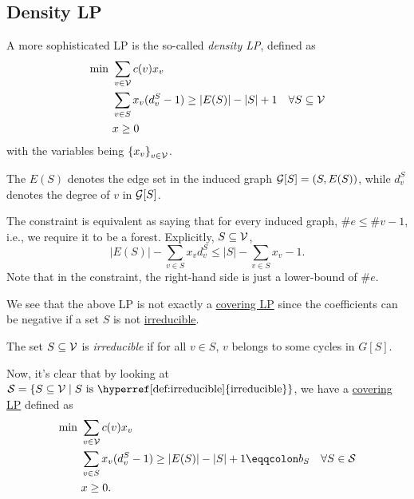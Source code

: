 \subsection{Density LP}

A more sophisticated LP is the so-called \emph{density LP}, defined as
\begin{align*}
	\min~ & \sum_{v\in \mathcal{\MakeUppercase{v}} } c(v) x_v                                                                                                  \\
	      & \sum_{v\in S} x_v(d_v^{S} - 1) \geq \left\vert E(S) \right\vert - \left\vert S \right\vert + 1\quad \forall S\subseteq \mathcal{\MakeUppercase{v}} \\
	      & x\geq 0
\end{align*}
with the variables being \(\left\{ x_v \right\} _{v\in \mathcal{\MakeUppercase{v}} }\).

\begin{notation}
	The \(E(S)\) denotes the edge set in the induced graph \(\mathcal{\MakeUppercase{g}} [S] = (S, E(S))\), while \(d_v^S\) denotes the degree of \(v\) in \(\mathcal{\MakeUppercase{g}} [S]\).
\end{notation}

\begin{intuition}
	The constraint is equivalent as  saying that for every induced graph, \(\# e \leq \# v - 1\), i.e., we require it to be a forest. Explicitly, \(S\subseteq \mathcal{\MakeUppercase{v}} \),
	\[
		\left\vert E(S) \right\vert - \sum_{v\in S} x_v d_v^S\leq \left\vert S \right\vert - \sum_{v\in S}x_v - 1.
	\]
	Note that in the constraint, the right-hand side is just a lower-bound of \(\# e\).
\end{intuition}

We see that the above LP is not exactly a \hyperref[def:covering-LP]{covering LP} since the coefficients can be negative if a set \(S\) is not \hyperref[def:irreducible]{irreducible}.

\begin{definition}[Irreducible]\label{def:irreducible}
	The set \(S\subseteq \mathcal{\MakeUppercase{v}} \) is \emph{irreducible} if for all \(v\in S\), \(v\) belongs to some cycles in \(G[S]\).
\end{definition}

Now, it's clear that by looking at \(\mathcal{\MakeUppercase{S}} = \left\{ S\subseteq \mathcal{\MakeUppercase{v}} \mid S \text{ is \hyperref[def:irreducible]{irreducible}}\right\} \), we have a \hyperref[def:covering-LP]{covering LP} defined as
\begin{align*}
	\min~ & \sum_{v\in \mathcal{\MakeUppercase{v}} } c(v) x_v                                                                                                          \\
	      & \sum_{v\in S} x_v(d_v^{S} - 1) \geq \left\vert E(S) \right\vert - \left\vert S \right\vert + 1 \eqqcolon b_S\quad \forall S\in \mathcal{\MakeUppercase{S}} \\
	      & x\geq 0.
\end{align*}

